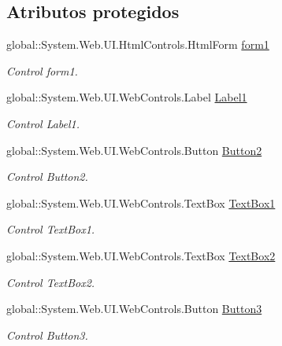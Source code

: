 \subsection*{Atributos protegidos}
\begin{DoxyCompactItemize}
\item 
global\+::\+System.\+Web.\+U\+I.\+Html\+Controls.\+Html\+Form \mbox{\hyperlink{classInicio_1_1Registrados_a902f9075b41d6386d17242fe32dea6e4}{form1}}
\begin{DoxyCompactList}\small\item\em Control form1. \end{DoxyCompactList}\item 
global\+::\+System.\+Web.\+U\+I.\+Web\+Controls.\+Label \mbox{\hyperlink{classInicio_1_1Registrados_a89cbfd8509272c14e26ee466a11b7835}{Label1}}
\begin{DoxyCompactList}\small\item\em Control Label1. \end{DoxyCompactList}\item 
global\+::\+System.\+Web.\+U\+I.\+Web\+Controls.\+Button \mbox{\hyperlink{classInicio_1_1Registrados_a92bb41484c2ad0de40bf04ea1ad2c868}{Button2}}
\begin{DoxyCompactList}\small\item\em Control Button2. \end{DoxyCompactList}\item 
global\+::\+System.\+Web.\+U\+I.\+Web\+Controls.\+Text\+Box \mbox{\hyperlink{classInicio_1_1Registrados_a2ec529c41bccbe1d45b53e29aad8d1f4}{Text\+Box1}}
\begin{DoxyCompactList}\small\item\em Control Text\+Box1. \end{DoxyCompactList}\item 
global\+::\+System.\+Web.\+U\+I.\+Web\+Controls.\+Text\+Box \mbox{\hyperlink{classInicio_1_1Registrados_a14706b4c2eeec2fe1d93f7d0ae00993c}{Text\+Box2}}
\begin{DoxyCompactList}\small\item\em Control Text\+Box2. \end{DoxyCompactList}\item 
global\+::\+System.\+Web.\+U\+I.\+Web\+Controls.\+Button \mbox{\hyperlink{classInicio_1_1Registrados_ac3990a81617665a0ef39beeb50d83806}{Button3}}
\begin{DoxyCompactList}\small\item\em Control Button3. \end{DoxyCompactList}\item 

\end{DoxyCompactItemize}
